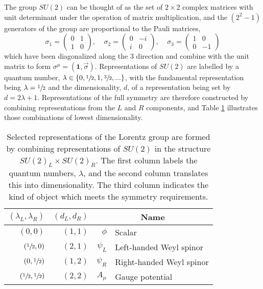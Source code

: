  The group $SU(2)$ can be thought of as 
  the set of $2\times 2$ complex matrices 
  with unit determinant under the operation 
  of matrix multiplication, 
  and the $(2^2-1)$ generators of the group are
  proportional to the
  Pauli matrices,
\begin{equation}\label{eq:paulimatrix}
\sigma_1 = 
\begin{pmatrix}
0 & 1 \\ 1 & 0 
\end{pmatrix}, \;\;\;\;
\sigma_2 = 
\begin{pmatrix}
0 & -i \\ i & 0 
\end{pmatrix}, \;\;\;\;
\sigma_3 = 
\begin{pmatrix}
1 & 0 \\ 0 & -1 
\end{pmatrix}
\end{equation}
 which have been diagonalized
 along the $3$ direction 
 and combine with the unit matrix to form 
 $\sigma^\mu = (\mathbf{1},\vec{\sigma})$.
 Representations of $SU(2)$ are
  labelled by a quantum number, 
  ${\lambda\in\{0,\sfrac{1}{2},1,\sfrac{3}{2},...\}}$,
  with the fundamental representation being
  $\lambda=\sfrac{1}{2}$ and the dimensionality, $d$, of
  a representation being set by $d=2\lambda+1$.
 Representations of the full symmetry are therefore
  constructed by combining representations
  from the $L$ and $R$ components, and
  Table \ref{tab:repssu2} illustrates
  those combinations of lowest dimensionality.
  
\begin{table}[tb]
\caption[Representations of $SU(2)\times SU(2)$]
{
 Selected representations of the Lorentz group
  are formed by combining representations of $SU(2)$
  in the structure $SU(2)_L\times SU(2)_R$.
 The first column labels the quantum numbers,
  $\lambda$, and the second column
  translates this into dimensionality.
 The third column indicates the kind of
  object which meets the symmetry requirements.
}
\label{tab:repssu2}
\begin{center}
\begin{tabular}{r|r|rl}
 $(\lambda_L,\lambda_R)$ & $(d_L, d_R)$ & \multicolumn{2}{c}{Name} \\
\hline
\hline
 $(0,0)$   &  $(1,1)$  & $\phi$ &  Scalar \\
 $(\sfrac{1}{2},0)$ &  $(2,1)$  & $\psi_L$ &  Left-handed Weyl spinor \\
 $(0,\sfrac{1}{2})$ &  $(1,2)$  & $\psi_R$ &  Right-handed Weyl spinor \\
 $(\sfrac{1}{2},\sfrac{1}{2})$ & $(2,2)$ & $A_\mu$ &  Gauge potential
\end{tabular}
\end{center}
\end{table}

